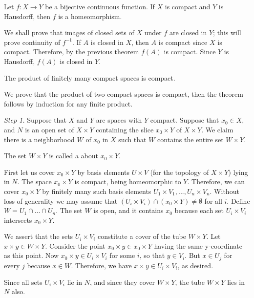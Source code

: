 \documentclass[12pt, a4paper, twoside, openright, titlepage]{book}
\begin{document}
\begin{thm}{}{}
    Let $f:X\rightarrow Y$ be a bijective continuous function. If $X$ is compact and $Y$ is Hausdorff, then $f$ is a homeomorphism.
\end{thm}
\begin{proof*}{}{}
    We shall prove that images of closed sets of $X$ under $f$ are closed in $Y$; this will prove continuity of $f^{-1}$. If $A$ is closed in $X$, then $A$ is compact since $X$ is compact. Therefore, by the previous theorem $f(A)$ is compact. Since $Y$ is Hausdorff, $f(A)$ is closed in $Y$.
\end{proof*}

\begin{thm}{}{}
    The product of finitely many compact spaces is compact.
\end{thm}
\begin{proof*}{}{}
    We prove that the product of two compact spaces is compact, then the theorem follows by induction for any finite product.

    \emph{Step 1.} Suppose that $X$ and $Y$ are spaces with $Y$ compact. Suppose that $x_0 \in X$, and $N$ is an open set of $X\times Y$ containing the slice $x_0\times Y$ of $X\times Y$.
    We claim there is a neighborhood $W$ of $x_0$ in $X$ such that $W$ contains the entire set $W\times Y$.

    The set $W\times Y$ is called a  about $x_0\times Y$.

    First let us cover $x_0\times Y$ by basis elements $U\times V$ (for the topology of $X\times Y$) lying in $N$. The space $x_0 \times Y$ is compact, being homeomorphic to $Y$. Therefore, we can cover $x_0\times Y$ by finitely many such basis elements $U_1\times V_1,...,U_n\times V_n$. Without loss of generality we may assume that $(U_i\times V_i) \cap (x_0\times Y) \neq \emptyset$ for all $i$. Define $W = U_1\cap ... \cap U_n$. The set $W$ is open, and it contains $x_0$ because each set $U_i\times V_i$ intersects $x_0\times Y$.

    We assert that the sets $U_i\times V_i$ constitute a cover of the tube $W\times Y$. Let $x\times y \in W\times Y$. Consider the point $x_0\times y \in x_0\times Y$ having the same y-coordinate as this point. Now $x_0\times y \in U_i\times V_i$ for some $i$, so that $y \in V_i$. But $x \in U_j$ for every $j$ because $x \in W$. Therefore, we have $x \times y \in U_i\times V_i$, as desired.

    Since all sets $U_i\times V_i$ lie in $N$, and since they cover $W\times Y$, the tube $W\times Y$ lies in $N$ also.


\end{proof*}
\end{document}
